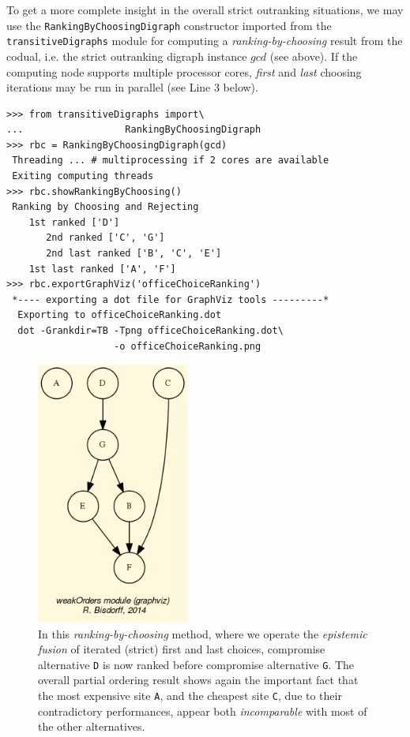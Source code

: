 To get a more complete insight in the overall strict outranking situations, we may use the \texttt{RankingByChoosingDigraph} constructor imported from the \texttt{transitiveDigraphs} module for computing a \emph{ranking-by-choosing} result from the codual, i.e. the strict outranking digraph instance $gcd$ (see above). If the computing node supports multiple processor cores, \emph{first} and \emph{last} choosing iterations may be run in parallel (see Line 3 below).
\begin{lstlisting}
>>> from transitiveDigraphs import\
...                  RankingByChoosingDigraph
>>> rbc = RankingByChoosingDigraph(gcd)
 Threading ... # multiprocessing if 2 cores are available
 Exiting computing threads
>>> rbc.showRankingByChoosing()
 Ranking by Choosing and Rejecting
    1st ranked ['D']
       2nd ranked ['C', 'G']
       2nd last ranked ['B', 'C', 'E']
    1st last ranked ['A', 'F']
>>> rbc.exportGraphViz('officeChoiceRanking')
 *---- exporting a dot file for GraphViz tools ---------*
  Exporting to officeChoiceRanking.dot
  dot -Grankdir=TB -Tpng officeChoiceRanking.dot\
                   -o officeChoiceRanking.png
\end{lstlisting}
\begin{figure}[h]
\sidecaption[t]
\includegraphics[width=5cm]{Figures/officeChoiceRanking.png}
\caption{In this \emph{ranking-by-choosing} method, where we operate the \emph{epistemic fusion} of iterated (strict) first and last choices, compromise alternative \texttt{D} is now ranked before compromise alternative \texttt{G}. The overall partial ordering result shows again the important fact that the most expensive site \texttt{A}, and the cheapest site \texttt{C}, due to their contradictory performances, appear both \emph{incomparable} with most of the other alternatives.} 
\label{fig:4.4}       %
\end{figure}
